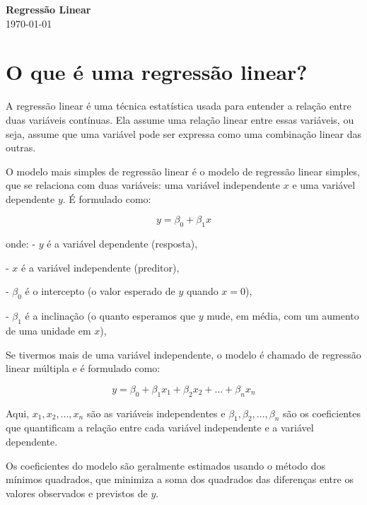 \documentclass[12pt,a4paper, brazil]{article}
\begin{document}
\begin{center}
{\textbf {\huge Regressão Linear}}\\[5mm]
\today\\[5mm] %
\end{center}



\section{O que é uma regressão linear?}

A regressão linear é uma técnica estatística usada para entender a relação entre duas variáveis contínuas. Ela assume uma relação linear entre essas variáveis, ou seja, assume que uma variável pode ser expressa como uma combinação linear das outras.

O modelo mais simples de regressão linear é o modelo de regressão linear simples, que se relaciona com duas variáveis: uma variável independente $x$ e uma variável dependente $y$. É formulado como:

$$y = \beta_0 + \beta_1x $$

\noindent onde:
- $y$ é a variável dependente (resposta),

- $x$ é a variável independente (preditor),

- $\beta_0$ é o intercepto (o valor esperado de $y$ quando $x=0$),

- $\beta_1$ é a inclinação (o quanto esperamos que $y$ mude, em média, com um aumento de uma unidade em $x$),

Se tivermos mais de uma variável independente, o modelo é chamado de regressão linear múltipla e é formulado como:

$$y = \beta_0 + \beta_1x_1 + \beta_2x_2 + ... + \beta_nx_n $$

Aqui, $x_1, x_2, ..., x_n$ são as variáveis independentes e $\beta_1, \beta_2, ..., \beta_n$ são os coeficientes que quantificam a relação entre cada variável independente e a variável dependente.

Os coeficientes do modelo são geralmente estimados usando o método dos mínimos quadrados, que minimiza a soma dos quadrados das diferenças entre os valores observados e previstos de $y$.
\end{document}
